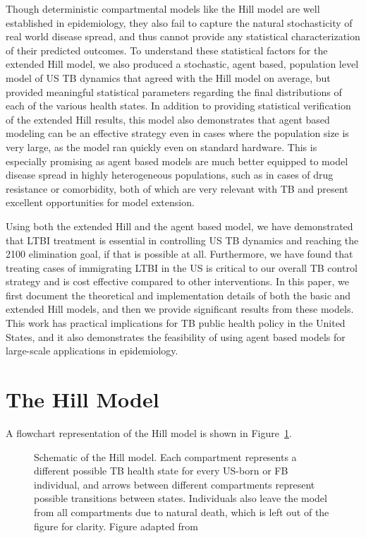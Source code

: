 \documentclass{amsart}
\renewcommand{\(}{\left(}
\renewcommand{\)}{\right)}
\begin{document}
Though deterministic compartmental models like the Hill model are well
established in epidemiology, they also fail to capture the natural stochasticity
of real world disease spread, and thus cannot provide any statistical
characterization of their predicted outcomes. To understand these statistical
factors for the extended Hill model, we also produced a stochastic, agent based,
population level model of US TB dynamics that agreed with the Hill model on
average, but provided meaningful statistical parameters regarding the final
distributions of each of the various health states. In addition to providing
statistical verification of the extended Hill results, this model also
demonstrates that agent based modeling can be an effective strategy even in
cases where the population size is very large, as the model ran quickly
even on standard hardware.  This is especially promising as agent based models
are much better equipped to model disease spread in highly heterogeneous
populations, such as in cases of drug resistance or comorbidity, both of which
are very relevant with TB and present excellent opportunities for model
extension. 

Using both the extended Hill and the agent based model, we have demonstrated
that LTBI treatment is essential in controlling US TB dynamics and reaching the
2100 elimination goal, if that is possible at all. Furthermore, we have found
that treating cases of immigrating LTBI in the US is critical to our overall TB
control strategy and is cost effective compared to other interventions. In this
paper, we first document the theoretical and implementation details of both the
basic and extended Hill models, and then we provide significant results from
these models. This work has practical implications for TB public health policy
in the United States, and it also demonstrates the feasibility of using agent
based models for large-scale applications in epidemiology.  

\section{The Hill Model}
\label{sec:hillModel}
A flowchart representation of the Hill model is shown in
Figure~\ref{fig:hillModelSchematic}. 

\begin{figure}[h]
  \begin{center}
    
  \end{center}
  \caption{Schematic of the Hill model. Each compartment represents a different
    possible TB health state for every US-born or FB individual, and arrows
    between different compartments represent possible transitions between
    states. Individuals also leave the model from all compartments due to
    natural death, which is left out of the figure for clarity. Figure adapted
    from \cite{hill_modelling_2012}}
  \label{fig:hillModelSchematic}
\end{figure}
\end{document}
